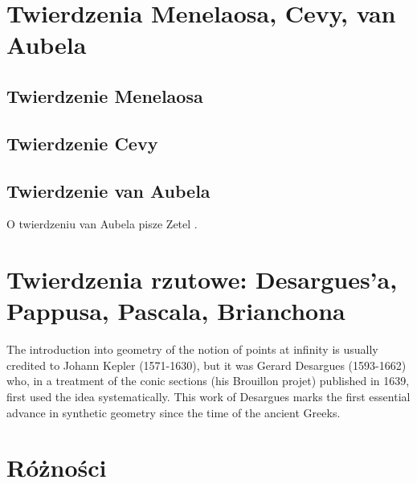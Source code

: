 
%

\section{Twierdzenia Menelaosa, Cevy, van Aubela}
\subsection{Twierdzenie Menelaosa}

\subsection{Twierdzenie Cevy}
 

\subsection{Twierdzenie van Aubela}
O twierdzeniu van Aubela pisze Zetel \cite[s. 24]{zetel_2020}.


\section{Twierdzenia rzutowe: Desargues'a, Pappusa, Pascala, Brianchona}




The introduction into geometry of the notion of points at infinity is usually credited to Johann Kepler (1571-1630), but it was Gerard
Desargues (1593-1662) who, in a treatment of the conic sections
(his Brouillon projet) published in 1639, first used the idea systematically. This work of Desargues marks the first essential advance in synthetic geometry since the time of the ancient Greeks.

\section{Różności}



%